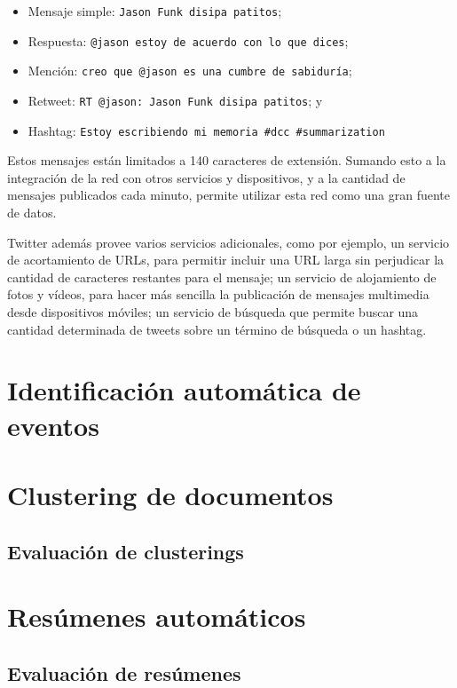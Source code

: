 \documentclass[upright, contnum]{umemoria}
\begin{document}
\begin{itemize}
\item Mensaje simple: \texttt{Jason Funk disipa patitos};
\item Respuesta: \texttt{@jason estoy de acuerdo con lo que dices};
\item Mención: \texttt{creo que @jason es una cumbre de sabiduría};
\item Retweet: \texttt{RT @jason: Jason Funk disipa patitos}; y
\item Hashtag: \texttt{Estoy escribiendo mi memoria \#dcc \#summarization}
\end{itemize}
Estos mensajes están limitados a 140 caracteres de extensión. Sumando
esto a la integración de la red con otros servicios y dispositivos, y
a la cantidad de mensajes publicados cada minuto, permite utilizar
esta red como una gran fuente de datos.

Twitter además provee varios servicios adicionales, como por ejemplo,
un servicio de acortamiento de URLs, para permitir incluir una URL
larga sin perjudicar la cantidad de caracteres restantes para el
mensaje; un servicio de alojamiento de fotos y vídeos, para hacer más
sencilla la publicación de mensajes multimedia desde dispositivos
móviles; un servicio de búsqueda que permite buscar una cantidad
determinada de tweets sobre un término de búsqueda o un hashtag.


\section{Identificación automática de eventos}
\label{sec-2.2}

\section{Clustering de documentos}
\label{sec-2.3}

\subsection{Evaluación de clusterings}
\label{sec-2.3.1}

\section{Resúmenes automáticos}
\label{sec-2.4}

\subsection{Evaluación de resúmenes}
\label{sec-2.4.1}
\end{document}
